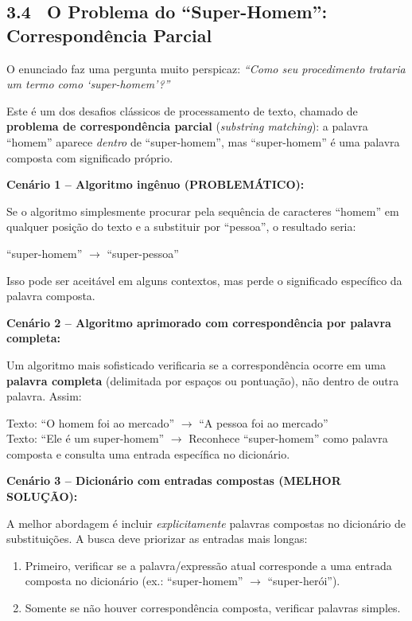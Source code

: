 \documentclass[12pt,a4paper]{article}
\begin{document}
\bigskip

\subsection*{3.4 \ O Problema do ``Super-Homem'': Correspondência Parcial}

O enunciado faz uma pergunta muito perspicaz: \textit{``Como seu procedimento trataria
um termo como `super-homem'?''}

Este é um dos desafios clássicos de processamento de texto, chamado de
\textbf{problema de correspondência parcial} (\textit{substring matching}):
a palavra ``homem'' aparece \textit{dentro} de ``super-homem'', mas
``super-homem'' é uma palavra composta com significado próprio.

\textbf{Cenário 1 -- Algoritmo ingênuo (PROBLEMÁTICO):}

Se o algoritmo simplesmente procurar pela sequência de caracteres ``homem'' em
qualquer posição do texto e a substituir por ``pessoa'', o resultado seria:
\begin{center}
``super-homem'' $\to$ ``super-pessoa''
\end{center}
Isso pode ser aceitável em alguns contextos, mas perde o significado específico
da palavra composta.

\bigskip
\textbf{Cenário 2 -- Algoritmo aprimorado com correspondência por palavra completa:}

Um algoritmo mais sofisticado verificaria se a correspondência ocorre em uma
\textbf{palavra completa} (delimitada por espaços ou pontuação), não dentro de
outra palavra. Assim:
\begin{center}
Texto: ``O homem foi ao mercado'' $\to$ ``A pessoa foi ao mercado'' \\[4pt]
Texto: ``Ele é um super-homem'' $\to$ Reconhece ``super-homem'' como palavra
composta e consulta uma entrada específica no dicionário.
\end{center}

\textbf{Cenário 3 -- Dicionário com entradas compostas (MELHOR SOLUÇÃO):}

A melhor abordagem é incluir \textit{explicitamente} palavras compostas no dicionário
de substituições. A busca deve priorizar as entradas mais longas:

\begin{enumerate}
  \item Primeiro, verificar se a palavra/expressão atual corresponde a uma entrada
  composta no dicionário (ex.: ``super-homem'' $\to$ ``super-herói'').
  \item Somente se não houver correspondência composta, verificar palavras simples.
\end{enumerate}
\end{document}
